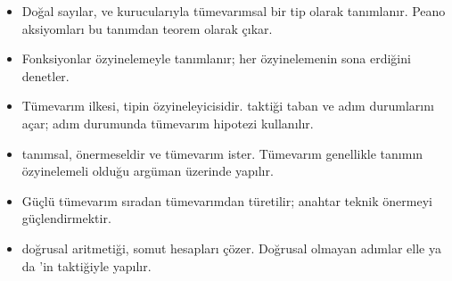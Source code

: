 \begin{bolumozeti}
\begin{itemize}
  \item Doğal sayılar,  ve  kurucularıyla tümevarımsal
        bir tip olarak tanımlanır. Peano aksiyomları bu tanımdan teorem
        olarak çıkar.
  \item Fonksiyonlar özyinelemeyle tanımlanır; \Lean{} her özyinelemenin
        sona erdiğini denetler.
  \item Tümevarım ilkesi, tipin özyineleyicisidir. 
        taktiği taban ve adım durumlarını açar; adım durumunda
        tümevarım hipotezi  kullanılır.
  \item {} tanımsal,  önermeseldir ve tümevarım
        ister. Tümevarım genellikle tanımın özyinelemeli olduğu argüman
        üzerinde yapılır.
  \item Güçlü tümevarım sıradan tümevarımdan türetilir; anahtar teknik
        önermeyi güçlendirmektir.
  \item {} doğrusal aritmetiği,  somut
        hesapları çözer. Doğrusal olmayan adımlar elle ya da \Mathlib{}'in
         taktiğiyle yapılır.
\end{itemize}
\end{bolumozeti}

